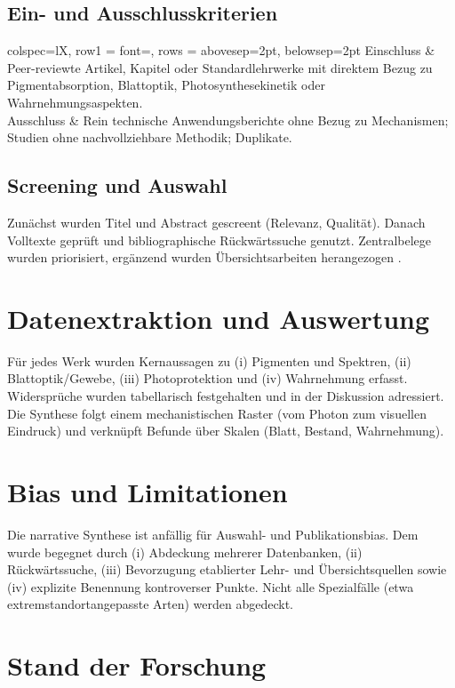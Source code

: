 \subsection{Ein- und Ausschlusskriterien}
\begin{tblr}{
  colspec={lX},
  row{1} = {font=\bfseries},
  rows = {abovesep=2pt, belowsep=2pt}
}
Einschluss & Peer-reviewte Artikel, Kapitel oder Standardlehrwerke mit direktem Bezug zu Pigmentabsorption, Blattoptik, Photosynthesekinetik oder Wahrnehmungsaspekten. \\
Ausschluss & Rein technische Anwendungsberichte ohne Bezug zu Mechanismen; Studien ohne nachvollziehbare Methodik; Duplikate. \\
\end{tblr}

\subsection{Screening und Auswahl}
Zunächst wurden Titel und Abstract gescreent (Relevanz, Qualität). Danach Volltexte geprüft und bibliographische Rückwärtssuche genutzt. Zentralbelege wurden priorisiert, ergänzend wurden Übersichtsarbeiten herangezogen \parencite{meyer2018photosynthese, schmidt2015chlorophyll, gao2010lightabsorption, zhao2012chlorophyll, renoult2017evolution}.

\section{Datenextraktion und Auswertung}
Für jedes Werk wurden Kernaussagen zu (i) Pigmenten und Spektren, (ii) Blattoptik/Gewebe, (iii) Photoprotektion und (iv) Wahrnehmung erfasst. Widersprüche wurden tabellarisch festgehalten und in der Diskussion adressiert. Die Synthese folgt einem mechanistischen Raster (vom Photon zum visuellen Eindruck) und verknüpft Befunde über Skalen (Blatt, Bestand, Wahrnehmung).

\section{Bias und Limitationen}
Die narrative Synthese ist anfällig für Auswahl- und Publikationsbias. Dem wurde begegnet durch (i) Abdeckung mehrerer Datenbanken, (ii) Rückwärtssuche, (iii) Bevorzugung etablierter Lehr- und Übersichtsquellen sowie (iv) explizite Benennung kontroverser Punkte. Nicht alle Spezialfälle (etwa extremstandortangepasste Arten) werden abgedeckt.

\section{Stand der Forschung}
